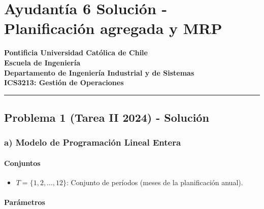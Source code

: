 \documentclass[
]{article}
\author{}
\date{}
\providecommand{\tightlist}{%
  \setlength{\itemsep}{0pt}\setlength{\parskip}{0pt}}
\begin{document}
\hypertarget{ayudantuxeda-6-soluciuxf3n---planificaciuxf3n-agregada-y-mrp}{%
\section{Ayudantía 6 Solución - Planificación agregada y
MRP}\label{ayudantuxeda-6-soluciuxf3n---planificaciuxf3n-agregada-y-mrp}}

\textbf{Pontificia Universidad Católica de Chile}\\
\textbf{Escuela de Ingeniería}\\
\textbf{Departamento de Ingeniería Industrial y de Sistemas}\\
\textbf{ICS3213: Gestión de Operaciones}

\begin{center}\rule{0.5\linewidth}{0.5pt}\end{center}

\hypertarget{problema-1-tarea-ii-2024---soluciuxf3n}{%
\subsection{Problema 1 (Tarea II 2024) -
Solución}\label{problema-1-tarea-ii-2024---soluciuxf3n}}

\hypertarget{a-modelo-de-programaciuxf3n-lineal-entera}{%
\subsubsection{a) Modelo de Programación Lineal
Entera}\label{a-modelo-de-programaciuxf3n-lineal-entera}}

\hypertarget{conjuntos}{%
\paragraph{Conjuntos}\label{conjuntos}}

\begin{itemize}
\tightlist
\item
  \(T = \{1, 2, \dots, 12\}\): Conjunto de períodos (meses de la
  planificación anual).
\end{itemize}

\hypertarget{paruxe1metros}{%
\paragraph{Parámetros}\label{paruxe1metros}}
\end{document}
